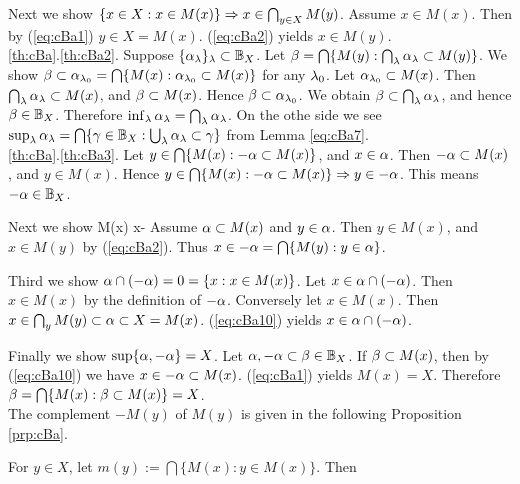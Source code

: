\documentclass{article}
\begin{document}
Next we show
$\{x\in X: x\in M(x)\} \Rightarrow x\in\bigcap_{y\in X}M(y)$.
Assume $x\in M(x)$.
Then by (\ref{eq:cBa1}) $y\in X=M(x)$. (\ref{eq:cBa2}) yields $x\in M(y)$.
\\
\ref{th:cBa}.\ref{th:cBa2}.
Suppose $\{\alpha_{\lambda}\}_{\lambda}\subset\mathbb{B}_{X}$.
Let $\beta=\bigcap\{M(y): \bigcap_{\lambda}\alpha_{\lambda}\subset M(y)\}$.
We show $\beta\subset\alpha_{\lambda_{0}}=\bigcap\{M(x):\alpha_{\lambda_{0}}\subset M(x)\}$ for any $\lambda_{0}$.
Let $\alpha_{\lambda_{0}}\subset M(x)$. Then $\bigcap_{\lambda}\alpha_{\lambda}\subset M(x)$, and 
$\beta\subset M(x)$.
Hence $\beta\subset\alpha_{\lambda_{0}}$.
We obtain $\beta\subset\bigcap_{\lambda}\alpha_{\lambda}$, and hence $\beta\in\mathbb{B}_{X}$.
Therefore $\inf_{\lambda}\alpha_{\lambda}=\bigcap_{\lambda}\alpha_{\lambda}$.
On the othe side we see
$\sup_{\lambda}\alpha_{\lambda}=\bigcap\{\gamma\in\mathbb{B}_{X}: \bigcup_{\lambda}\alpha_{\lambda}\subset \gamma\}$
from Lemma \ref{eq:cBa7}.
\\
\ref{th:cBa}.\ref{th:cBa3}.
Let $y\in\bigcap\{M(x):-\alpha\subset M(x)\}$, and $x\in\alpha$.
Then $-\alpha\subset M(x)$, and $y\in M(x)$.
Hence $y\in\bigcap\{M(x):-\alpha\subset M(x)\}\Rightarrow y\in -\alpha$.
This means $-\alpha\in\mathbb{B}_{X}$.

Next we show
\beqn\label{eq:cBa10}
\alp\subset M(x) \Rarw x\in -\alp
\eeqn
Assume $\alpha\subset M(x)$ and $y\in\alpha$. Then $y\in M(x)$, and $x\in M(y)$ by (\ref{eq:cBa2}).
Thus $x\in-\alpha=\bigcap\{M(y): y\in\alpha\}$.



Third we show $\alpha\cap(-\alpha)=0=\{x:x\in M(x)\}$.
Let $x\in \alpha\cap(-\alpha)$. Then $x\in M(x)$ by the definition of $-\alpha$.
Conversely let $x\in M(x)$. Then $x\in \bigcap_{y}M(y)\subset\alpha\subset X=M(x)$.
(\ref{eq:cBa10}) yields $x\in \alpha\cap(-\alpha)$.

Finally we show $\sup\{\alpha,-\alpha\}=X$.
Let $\alpha,-\alpha\subset\beta\in\mathbb{B}_{X}$.
If $\beta\subset M(x)$, then by (\ref{eq:cBa10}) we have $x\in -\alpha\subset M(x)$.
(\ref{eq:cBa1}) yields $M(x)=X$.
Therefore $\beta=\bigcap\{M(x): \beta\subset M(x)\}=X$.
\eprf
\\

The complement $-M(y)$ of $M(y)$ is given in the following Proposition \ref{prp:cBa}.

\bprp\label{prp:cBa}
For $y\in X$,
let $m(y):=\bigcap\{M(x): y\in M(x)\}$.
Then
\end{document}
